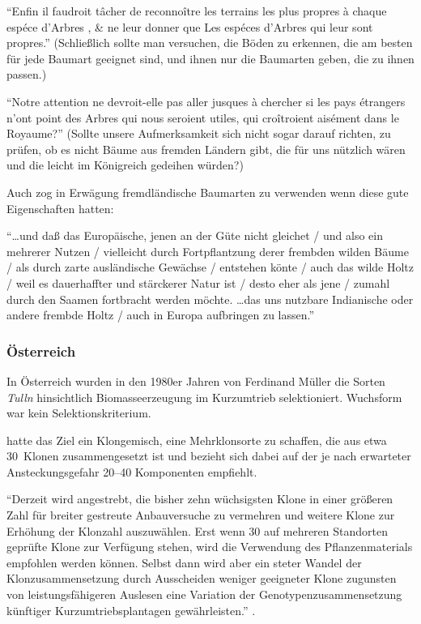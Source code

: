 \documentclass[twocolumn]{scrartcl}
\begin{document}
\enquote{Enfin il faudroit tâcher de reconnoître les terrains les plus  propres à chaque espéce d’Arbres , \& ne leur donner que Les espéces d’Arbres qui leur sont propres.} (Schließlich sollte man versuchen, die Böden zu erkennen, die am besten für jede Baumart geeignet sind, und ihnen nur die Baumarten geben, die zu ihnen passen.)

\enquote{Notre attention ne devroit-elle pas aller jusques à chercher si les pays étrangers n'ont point des Arbres qui nous seroient utiles, qui croîtroient aisément dans le Royaume?} (Sollte unsere Aufmerksamkeit sich nicht sogar darauf richten, zu prüfen, ob es nicht Bäume aus fremden Ländern gibt, die für uns nützlich wären und die leicht im Königreich gedeihen würden?)

Auch \citet[S.~253]{carlowitz1713sylvicultura} zog in Erwägung
fremdländische Baumarten zu verwenden wenn diese gute Eigenschaften
hatten:

\enquote{\dots und daß das Europäische, jenen an der Güte nicht gleichet / und also ein mehrerer Nutzen / vielleicht durch Fortpflantzung derer frembden wilden Bäume / als durch zarte ausländische Gewächse / entstehen könte / auch das wilde Holtz / weil es dauerhaffter  und stärckerer Natur ist / desto eher als jene / zumahl durch den Saamen fortbracht werden möchte.  \dots  das uns nutzbare Indianische oder andere frembde Holtz / auch in Europa aufbringen zu lassen.}

\subsubsection{Österreich}

In Österreich wurden in den 1980er Jahren von Ferdinand Müller die
Sorten \emph{Tulln} hinsichtlich Biomasseerzeugung im Kurzumtrieb
selektioniert. Wuchsform war kein Selektionskriterium.

\citet{mueller1999robinie} hatte das Ziel ein Klongemisch, eine
Mehrklonsorte zu schaffen, die aus etwa 30~Klonen zusammengesetzt ist
und bezieht sich dabei auf \citet{huehn1986klonanazahl} der je nach
erwarteter Ansteckungsgefahr 20--40 Komponenten empfiehlt.

\enquote{Derzeit wird angestrebt, die bisher zehn wüchsigsten Klone in
  einer größeren Zahl für breiter gestreute Anbauversuche zu vermehren
  und weitere Klone zur Erhöhung der Klonzahl auszuwählen. Erst wenn
  30 auf mehreren Standorten geprüfte Klone zur Verfügung stehen, wird
  die Verwendung des Pflanzenmaterials empfohlen werden können. Selbst
  dann wird aber ein steter Wandel der Klonzusammensetzung durch
  Ausscheiden weniger geeigneter Klone zugunsten von
  leistungsfähigeren Auslesen eine Variation der
  Genotypenzusammensetzung künftiger Kurzumtriebsplantagen
  gewährleisten.} \citep{mueller1999robinie}.
\end{document}
